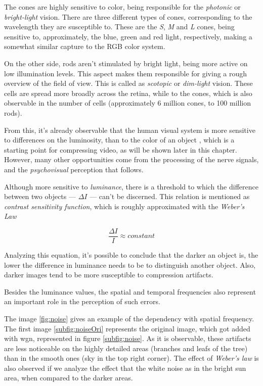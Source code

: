 The cones are highly sensitive to color, being responsible for the \emph{photonic} or \emph{bright-light} vision. There are three different types of cones, corresponding to the wavelength they are susceptible to. These are the \emph{S}, \emph{M} and \emph{L} cones, being sensitive to, approximately, the blue, green and red light, respectively, making a somewhat similar capture to the RGB color system.

On the other side, rods aren't stimulated by bright light, being more active on low illumination levels. This aspect makes them responsible for giving a rough overview of the field of view. This is called as \emph{scotopic} or \emph{dim-light} vision. These cells are spread more broadly across the retina, while to the cones, which is also observable in the number of cells (approximately 6 million cones, to 100 million rods).

From this, it's already observable that the human visual system is more sensitive to differences on the luminosity, than to the color of an object \cite{mullenContrastSensitivityHuman1985}, which is a starting point for compressing video, as will be shown later in this chapter. However, many other opportunities come from the processing of the nerve signals, and the \emph{psychovisual} perception that follows.

Although more sensitive to \emph{luminance}, there is a threshold to which the difference between two objects --- $\Delta I$ --- can't be discerned. This relation is mentioned as \emph{contrast sensitivity function}, which is roughly approximated with the \emph{Weber's Law}

\begin{equation}
    \frac{\Delta I}{I}\approx constant
\end{equation}

Analyzing this equation, it's possible to conclude that the darker an object is, the lower the difference in luminance needs to be to distinguish another object. Also, darker images tend to be more susceptible to compression artifacts.

Besides the luminance values, the spatial and temporal frequencies also represent an important role in the perception of such errors. 

The image \ref{fig:noise} gives an example of the dependency with spatial frequency. The first image \ref{subfig:noiseOri} represents the original image, which got added with \gls{wgn}, represented in figure \ref{subfig:noise}. As it is observable, these artifacts are less noticeable on the highly detailed areas (branches and leafs of the tree) than in the smooth ones (sky in the top right corner). The effect of \emph{Weber's law} is also observed if we analyze the effect that the white noise as in the bright sun area, when compared to the darker areas.

